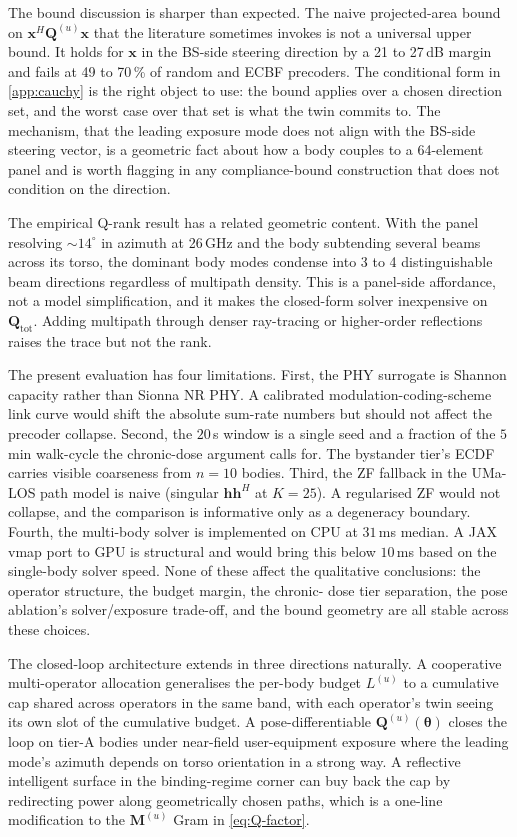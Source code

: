 \documentclass[journal,twocolumn,10pt]{IEEEtran}
\theoremstyle{plain}
\theoremstyle{remark}
\newcommand{\xx}{\mathbf{x}}
\newcommand{\hh}{\mathbf{h}}
\newcommand{\Qmat}{\mathbf{Q}}
\newcommand{\Mmat}{\mathbf{M}}
\begin{document}
The bound discussion is sharper than expected. The naive
projected-area bound on $\xx^H \Qmat^{(u)} \xx$ that the literature
sometimes invokes is not a universal upper bound. It holds for
$\xx$ in the BS-side steering direction by a 21 to 27\,dB margin and
fails at 49 to 70\,\% of random and ECBF precoders. The conditional
form in \cref{app:cauchy} is the right object to use: the bound
applies over a chosen direction set, and the worst case over that set
is what the twin commits to. The mechanism, that the leading
exposure mode does not align with the BS-side steering vector, is a
geometric fact about how a body couples to a 64-element panel and is
worth flagging in any compliance-bound construction that does not
condition on the direction.

The empirical Q-rank result has a related geometric content. With
the panel resolving $\sim 14^\circ$ in azimuth at 26\,GHz and the
body subtending several beams across its torso, the dominant body
modes condense into 3 to 4 distinguishable beam directions
regardless of multipath density. This is a panel-side affordance,
not a model simplification, and it makes the closed-form solver
inexpensive on $\Qmat_{\mathrm{tot}}$. Adding multipath through
denser ray-tracing or higher-order reflections raises the trace but
not the rank.

The present evaluation has four limitations. First, the PHY surrogate
is Shannon capacity rather than Sionna NR PHY. A calibrated
modulation-coding-scheme link curve would shift the absolute
sum-rate numbers but should not affect the precoder collapse. Second,
the $20\,$s window is a single seed and a fraction of the $5\,$min
walk-cycle the chronic-dose argument calls for. The bystander tier's
ECDF carries visible coarseness from $n = 10$ bodies. Third, the ZF
fallback in the UMa-LOS path model is naive (singular $\hh \hh^H$ at
$K = 25$). A regularised ZF would not collapse, and the comparison
is informative only as a degeneracy boundary. Fourth, the multi-body
solver is implemented on CPU at $31\,$ms median. A JAX vmap port to
GPU is structural and would bring this below $10\,$ms based on the
single-body solver speed. None of these affect the qualitative
conclusions: the operator structure, the budget margin, the chronic-
dose tier separation, the pose ablation's solver/exposure trade-off,
and the bound geometry are all stable across these choices.

The closed-loop architecture extends in three directions naturally.
A cooperative multi-operator allocation generalises the per-body
budget $L^{(u)}$ to a cumulative cap shared across operators in the
same band, with each operator's twin seeing its own slot of the
cumulative budget. A pose-differentiable $\Qmat^{(u)}(\bm\theta)$ closes the
loop on tier-A bodies under near-field user-equipment exposure
where the leading mode's azimuth depends on torso orientation in a
strong way. A reflective intelligent surface in the binding-regime
corner can buy back the cap by redirecting power along
geometrically chosen paths, which is a one-line modification to the
$\Mmat^{(u)}$ Gram in \cref{eq:Q-factor}.
\end{document}

